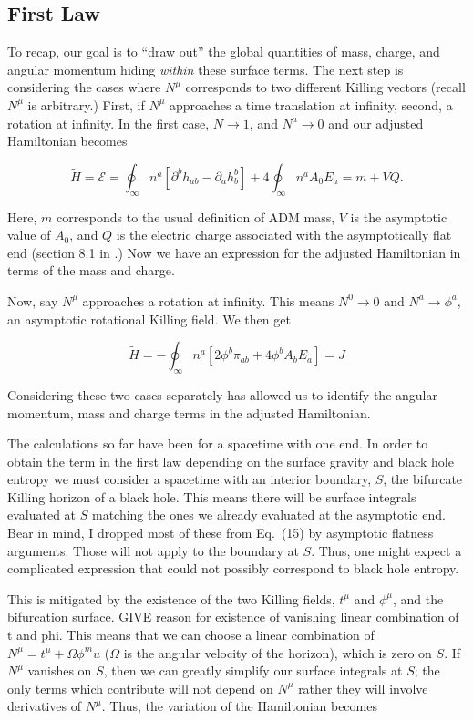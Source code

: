 \documentclass[titlepage]{article}
\def\beq{\begin{equation}}
\def\eeq{\end{equation}}
\begin{document}
\subsection{First Law}

\noindent
To recap, our goal is to ``draw out'' the global quantities of mass, charge, and angular momentum hiding \emph{within} these surface terms.  The next step is considering the cases where $N^\mu$ corresponds to two different Killing vectors (recall $N^\mu$ is arbitrary.) First, if $N^\mu$ approaches a time translation at infinity, second, a rotation at infinity.  In the first case, $N\rightarrow 1$, and $N^a\rightarrow 0$ and our adjusted Hamiltonian becomes

\beq
\tilde{H} = \mathcal{E} = \oint_{\infty}n^a \left[ \partial^b h_{ab} - \partial_a h^b_b \right] + 4 \oint_{\infty}n^a  A_0 E_a = m + VQ .
\eeq

\noindent
Here, $m$ corresponds to the usual definition of ADM mass, $V$ is the asymptotic value of $A_0$, and $Q$ is the electric charge associated with the asymptotically flat end (section 8.1 in \cite{ReallNotes}.)  Now we have an expression for the adjusted Hamiltonian in terms of the mass and charge.

Now, say $N^\mu$ approaches a rotation at infinity.  This means $N^0\rightarrow 0$ and $N^a\rightarrow \phi^a$, an asymptotic rotational Killing field.  We then get 

\beq
\tilde{H} = -\oint_{\infty}n^a \left[2 \phi^b  \pi_{ab} + 4 \phi^b A_b E_a \right] = J
\eeq

\noindent
Considering these two cases separately has allowed us to identify the angular momentum, mass and charge terms in the adjusted Hamiltonian.

The calculations so far have been for a spacetime with one end. In order to obtain the term in the first law depending on the surface gravity and black hole entropy we must consider a spacetime with an interior boundary, $S$, the bifurcate Killing horizon of a black hole.  This means there will be surface integrals evaluated at $S$ matching the ones we already evaluated at the asymptotic end.  Bear in mind, I dropped most of these from Eq.\ (15) by asymptotic flatness arguments.  Those will not apply to the boundary at $S$.  Thus, one might expect a complicated expression that could not possibly correspond to black hole entropy. 

This is mitigated by the existence of the two Killing fields, $t^\mu$ and $\phi^\mu$, and the bifurcation surface.  GIVE reason for existence of vanishing linear combination of t and phi.  This means that we can choose a linear combination of $N^\mu=t^\mu + \Omega \phi^mu$ ($\Omega$ is the angular velocity of the horizon), which is zero on $S$.  If $N^\mu$ vanishes on $S$, then we can greatly simplify our surface integrals at $S$; the only terms which contribute will not depend on $N^\mu$ rather they will involve derivatives of $N^\mu$. Thus, the variation of the Hamiltonian becomes
\end{document}
